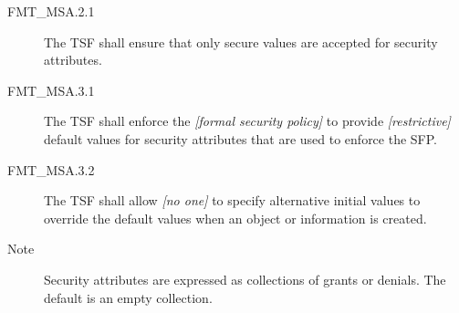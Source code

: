 \documentclass[12pt,english]{scrbook}
\begin{document}
\begin{description}

\item[FMT{\_}MSA.2.1]

    The TSF shall ensure that only secure values are accepted for security
    attributes.

\end{description}




\begin{description}
\item[FMT{\_}MSA.3.1]

The TSF shall enforce the \emph{{[}formal security policy]} to provide 
\emph{{[}restrictive]} default values for security attributes that are used to 
enforce the SFP.

\item[FMT{\_}MSA.3.2 ]

The TSF shall allow \emph{{[}no one]} to specify alternative
initial values to override the default values when an object or
information is created.

\item[Note]

Security attributes are expressed as collections of grants or
denials. The default is an empty collection.

\end{description}





\end{document}
